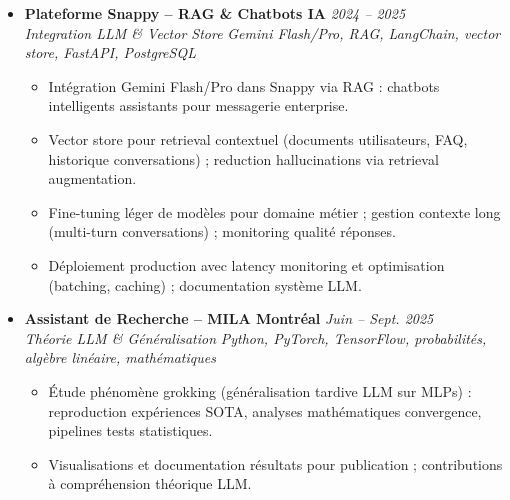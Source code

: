 \documentclass[a4paper,11pt]{article}
\begin{document}
\begin{itemize}[leftmargin=*, label={-}]
    \item \textbf{Plateforme Snappy -- RAG \& Chatbots IA} \hfill \textit{2024 -- 2025} \\
    \textit{Integration LLM \& Vector Store} \hfill \textit{Gemini Flash/Pro, RAG, LangChain, vector store, FastAPI, PostgreSQL}
    \vspace{-2pt}
    \begin{itemize}[leftmargin=0.4cm, nosep, label=\tiny$\bullet$]
        \item \small{Intégration Gemini Flash/Pro dans Snappy via RAG : chatbots intelligents assistants pour messagerie enterprise.}
        \item \small{Vector store pour retrieval contextuel (documents utilisateurs, FAQ, historique conversations) ; reduction hallucinations via retrieval augmentation.}
        \item \small{Fine-tuning léger de modèles pour domaine métier ; gestion contexte long (multi-turn conversations) ; monitoring qualité réponses.}
        \item \small{Déploiement production avec latency monitoring et optimisation (batching, caching) ; documentation système LLM.}
    \end{itemize}
    \vspace{3pt}

    \item \textbf{Assistant de Recherche -- MILA Montréal} \hfill \textit{Juin -- Sept. 2025} \\
    \textit{Théorie LLM \& Généralisation} \hfill \textit{Python, PyTorch, TensorFlow, probabilités, algèbre linéaire, mathématiques}
    \vspace{-2pt}
    \begin{itemize}[leftmargin=0.4cm, nosep, label=\tiny$\bullet$]
        \item \small{Étude phénomène grokking (généralisation tardive LLM sur MLPs) : reproduction expériences SOTA, analyses mathématiques convergence, pipelines tests statistiques.}
        \item \small{Visualisations et documentation résultats pour publication ; contributions à compréhension théorique LLM.}
    \end{itemize}
    \vspace{3pt}


\end{itemize}
\end{document}
